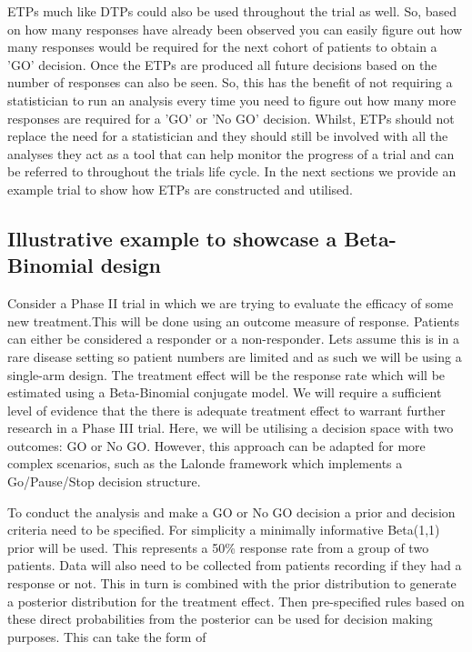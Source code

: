 ETPs much like DTPs could also be used throughout the trial as well. So, based on how many responses have already been observed you can easily figure out how many responses would be required for the next cohort of patients to obtain a 'GO' decision. Once the ETPs are produced all future decisions based on the number of responses can also be seen. So, this has the benefit of not requiring a statistician to run an analysis every time you need to figure out how many more responses are required for a 'GO' or 'No GO' decision. Whilst, ETPs should not replace the need for a statistician and they should still be involved with all the analyses they act as a tool that can help monitor the progress of a trial and can be referred to throughout the trials life cycle. In the next sections we provide an example trial to show how ETPs are constructed and utilised. 


\subsection{Illustrative example to showcase a Beta-Binomial design} 
\label{etp:BBIllEx}

Consider a Phase \RN{2} trial in which we are trying to evaluate the efficacy of some new treatment.This will be done using an outcome measure of response. Patients can either be considered a responder or a non-responder. Lets assume this is in a rare disease setting so patient numbers are limited and as such we will be using a single-arm design. The treatment effect will be the response rate which will be estimated using a Beta-Binomial conjugate model. We will require a sufficient level of evidence that the there is adequate treatment effect to warrant further research in a Phase \RN{3} trial. Here, we will be utilising a decision space with two outcomes: GO or No GO. However, this approach can be adapted for more complex scenarios, such as the Lalonde framework \cite{lalondeModelbasedDrugDevelopment2007} which implements a Go/Pause/Stop decision structure. 

To conduct the analysis and make a GO or No GO decision a prior and decision criteria need to be specified. For simplicity a minimally informative Beta(1,1) prior will be used. This represents a 50\% response rate from a group of two patients. Data will also need to be collected from patients recording if they had a response or not. This in turn is combined with the prior distribution to generate a posterior distribution for the treatment effect. Then pre-specified rules based on these direct probabilities from the posterior can be used for decision making purposes. This can take the form of

